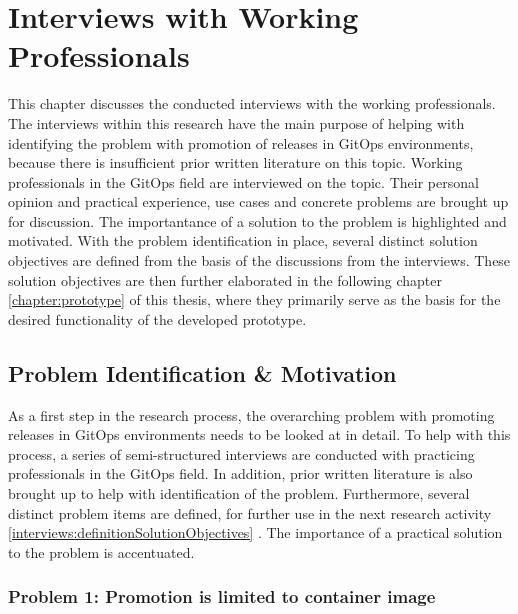 

\chapter{Interviews with Working Professionals}

This chapter discusses the conducted interviews with the working professionals.
The interviews within this research have the main purpose of helping with
identifying the problem with promotion of releases in GitOps environments,
because there is insufficient prior written literature on this topic.
Working professionals in the GitOps field are interviewed on the topic.
Their personal opinion and practical experience, use cases and concrete problems
are brought up for discussion. The importantance of a solution to the
problem is highlighted and motivated.
With the problem identification in place, several distinct solution objectives
are defined from the basis of the discussions from the interviews.
These solution objectives are then further elaborated in the following chapter
\ref{chapter:prototype} 
of this thesis, where they primarily serve as the basis for the
desired functionality of the developed prototype.

\section{Problem Identification \& Motivation}

As a first step in the research process,
the overarching problem with promoting releases in GitOps environments
needs to be looked at in detail.
To help with this process, a series of semi-structured interviews are conducted with
practicing professionals in the GitOps field. In addition, prior written literature
is also brought up to help with identification of the problem.
Furthermore, several distinct problem items are defined,
for further use in the next research activity
\ref{interviews:definitionSolutionObjectives} .
The importance of a practical solution to the problem is accentuated.

\subsection{Problem 1: Promotion is limited to container image}

